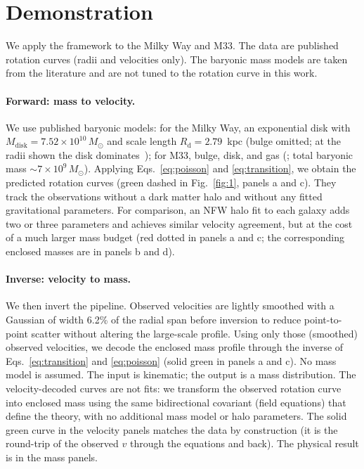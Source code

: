 \documentclass[aps,twocolumn,amsmath,amssymb,reprint,nofootinbib,nobalancelastpage]{revtex4-2}
\begin{document}
\section{Demonstration}
\label{sec:demonstration}

We apply the framework to the Milky Way and M33. The data are published rotation curves (radii and velocities only). The baryonic mass models are taken from the literature and are not tuned to the rotation curve in this work.

\paragraph{Forward: mass to velocity.}
We use published baryonic models: for the Milky Way, an exponential disk with $M_{\mathrm{disk}} = 7.52\times10^{10}\,M_\odot$ and scale length $R_{\mathrm{d}} = 2.79$~kpc (bulge omitted; at the radii shown the disk dominates~\cite{McMillan17}); for M33, bulge, disk, and gas (\cite{Corbelli00}; total baryonic mass $\sim 7\times10^9\,M_\odot$). Applying Eqs.~\ref{eq:poisson} and \ref{eq:transition}, we obtain the predicted rotation curves (green dashed in Fig.~\ref{fig:1}, panels a and c). They track the observations without a dark matter halo and without any fitted gravitational parameters. For comparison, an NFW halo fit to each galaxy adds two or three parameters and achieves similar velocity agreement, but at the cost of a much larger mass budget (red dotted in panels a and c; the corresponding enclosed masses are in panels b and d).

\paragraph{Inverse: velocity to mass.}
We then invert the pipeline. Observed velocities are lightly smoothed with a Gaussian of width 6.2\% of the radial span before inversion to reduce point-to-point scatter without altering the large-scale profile. Using only those (smoothed) observed velocities, we decode the enclosed mass profile through the inverse of Eqs.~\ref{eq:transition} and \ref{eq:poisson} (solid green in panels a and c). No mass model is assumed. The input is kinematic; the output is a mass distribution. The velocity-decoded curves are not fits: we transform the observed rotation curve into enclosed mass using the same bidirectional covariant (field equations) that define the theory, with no additional mass model or halo parameters. The solid green curve in the velocity panels matches the data by construction (it is the round-trip of the observed $v$ through the equations and back). The physical result is in the mass panels.
\end{document}
